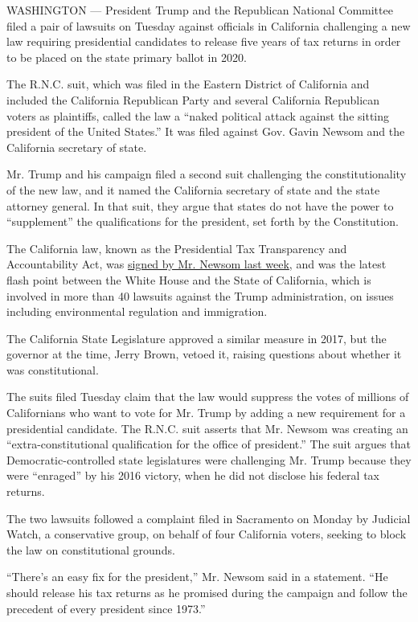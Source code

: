 WASHINGTON --- President Trump and the Republican National Committee
filed a pair of lawsuits on Tuesday against officials in California
challenging a new law requiring presidential candidates to release five
years of tax returns in order to be placed on the state primary ballot
in 2020.

The R.N.C. suit, which was filed in the Eastern District of California
and included the California Republican Party and several California
Republican voters as plaintiffs, called the law a ``naked political
attack against the sitting president of the United States.'' It was
filed against Gov. Gavin Newsom and the California secretary of state.

Mr. Trump and his campaign filed a second suit challenging the
constitutionality of the new law, and it named the California secretary
of state and the state attorney general. In that suit, they argue that
states do not have the power to ``supplement'' the qualifications for
the president, set forth by the Constitution.

The California law, known as the Presidential Tax Transparency and
Accountability Act, was
\href{https://www.nytimes3xbfgragh.onion/2019/07/30/us/politics/california-trump-tax-returns.html}{signed
by Mr. Newsom last week}, and was the latest flash point between the
White House and the State of California, which is involved in more than
40 lawsuits against the Trump administration, on issues including
environmental regulation and immigration.

The California State Legislature approved a similar measure in 2017, but
the governor at the time, Jerry Brown, vetoed it, raising questions
about whether it was constitutional.

The suits filed Tuesday claim that the law would suppress the votes of
millions of Californians who want to vote for Mr. Trump by adding a new
requirement for a presidential candidate. The R.N.C. suit asserts that
Mr. Newsom was creating an ``extra-constitutional qualification for the
office of president.'' The suit argues that Democratic-controlled state
legislatures were challenging Mr. Trump because they were ``enraged'' by
his 2016 victory, when he did not disclose his federal tax returns.

The two lawsuits followed a complaint filed in Sacramento on Monday by
Judicial Watch, a conservative group, on behalf of four California
voters, seeking to block the law on constitutional grounds.

``There's an easy fix for the president,'' Mr. Newsom said in a
statement. ``He should release his tax returns as he promised during the
campaign and follow the precedent of every president since 1973.''

